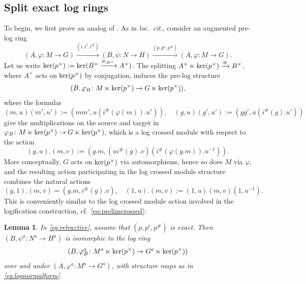 \documentclass[a4paper,10pt%
]{amsart}
\numberwithin{equation}{section}
\newtheorem{lemma}[subsection]{Lemma}
\theoremstyle{definition}
\renewcommand{\:}{\colon}
\begin{document}
\subsection{Split exact log rings}\label{subsec:splitexact} To begin, we first prove an analog of \cite[Lemma 2.12]{Lun25}. As in \emph{loc.\ cit.}, consider an augmented pre-log ring \begin{equation}\label{eq:retractive}(A, \varphi \colon M \to G) \xrightarrow{(i, i^\flat, i^\#)} (B, \psi \colon N \to H) \xrightarrow{(p, p^\flat, p^\#)} (A, \varphi \colon M \to G).\end{equation} Let us write ${\rm ker}(p^\times) := {\rm ker}(B^\times \xrightarrow{p_{|B^\times}} A^\times)$. The splitting $A^\times \ltimes {\rm ker}(p^\times) \xrightarrow{\cong} B^\times$, where $A^\times$ acts on ${\rm ker}(p^\times)$ by conjugation, induces the pre-log structure \begin{equation}\label{eq:lognormalform}(B, \varphi_B \colon M \ltimes {\rm ker}(p^\times) \to G \ltimes {\rm ker}(p^\times)),\end{equation} where the formulas \[(m, u)(m', u') := (mm', u(i^\#(\varphi(m)).u')), \quad (g, u)(g', u') := (gg', u(i^\#(g).u'))\] give the multiplications on the source and target in $\varphi_B \colon M \ltimes {\rm ker}(p^\times) \to G \ltimes {\rm ker}(p^\times)$, which is a log crossed module with respect to the action \[(g, u).(m, v) := (g.m, (ui^\#(g).v)(i^\#(\varphi(g.m)).u^{-1})).\] More conceptually, $G$ acts on ${\rm ker}(p^\times)$ via automorphisms, hence so does $M$ via $\varphi$, and the resulting action participating in the log crossed module structure combines the natural actions \[(g, 1).(m, v) = (g.m, i^\#(g).v), \quad (1, u).(m, v) := (1, u)(m, v)(1, u^{-1}).\] This is conveniently similar to the log crossed module action involved in the logification construction, cf.\ \eqref{eq:prelimcrossed}:

\begin{lemma}\label{lem:retractivelog} In \eqref{eq:retractive}, assume that $(p, p^\flat, p^\#)$ is exact. Then $(B, \psi^a \colon N^a \to H^a)$ is isomorphic to the log ring \begin{equation}\label{eq:retractivelog}(B, \varphi_B^a \colon M^a \ltimes {\rm ker}(p^\times) \to G^a \ltimes {\rm ker}(p^\times))\end{equation} over and under $(A, \varphi^a \colon M^a \to G^a)$, with structure maps as in \eqref{eq:lognormalform}. 
\end{lemma}
\end{document}
